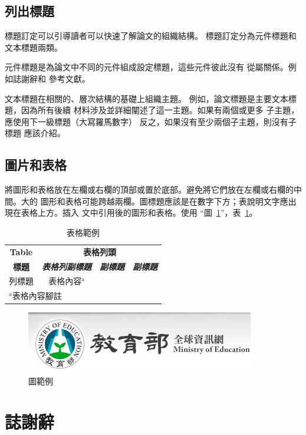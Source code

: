 \documentclass[conference]{IEEEtran}
\begin{document}
\subsection{列出標題}
標題訂定可以引導讀者可以快速了解論文的組織結構。
標題訂定分為元件標題和文本標題兩類。

元件標題是為論文中不同的元件組成設定標題，這些元件彼此沒有
從屬關係。例如誌謝辭和
參考文獻。

文本標題在相關的、層次結構的基礎上組織主題。
例如，論文標題是主要文本標題，因為所有後續
材料涉及並詳細闡述了這一主題。如果有兩個或更多
子主題，應使用下一級標題（大寫羅馬數字）
反之，如果沒有至少兩個子主題，則沒有子標題
應該介紹。

\subsection{圖片和表格}
將圖形和表格放在左欄或右欄的頂部或置於底部。避免將它們放在左欄或右欄的中間。大的
圖形和表格可能跨越兩欄。圖標題應該是在數字下方；表說明文字應出現在表格上方。插入
文中引用後的圖形和表格。使用
``圖~\ref{fig}''，表~\ref{tab1}。

\begin{table}[htbp]
\caption{表格範例}
\begin{center}
\begin{tabular}{|c|c|c|c|}
\hline
\textbf{Table}&\multicolumn{3}{|c|}{\textbf{表格列頭}} \\
\cline{2-4}
\textbf{標題} & \textbf{\textit{表格列副標題}}& \textbf{\textit{副標題}}& \textbf{\textit{副標題}} \\
\hline
列標題& 表格內容$^{\mathrm{a}}$& &  \\
\hline
\multicolumn{4}{l}{$^{\mathrm{a}}$表格內容腳註}
\end{tabular}
\label{tab1}
\end{center}
\end{table}

\begin{figure}[htbp]
\centerline{\includegraphics{fig1.png}}
\caption{圖範例}
\label{fig}
\end{figure}



\section*{誌謝辭}
\end{document}
